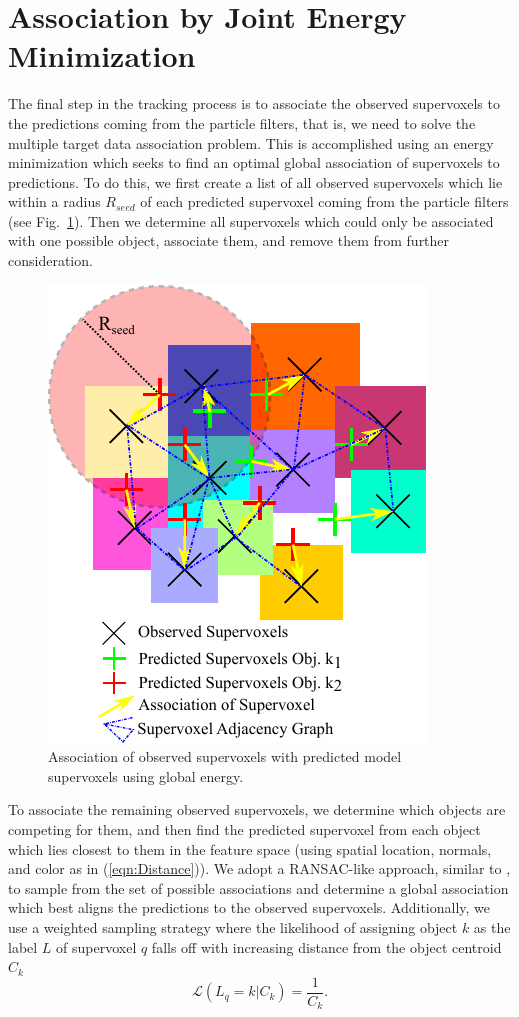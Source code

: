 \section{Association by Joint Energy Minimization}
The final step in the tracking process is to associate the observed supervoxels to the predictions coming from the particle filters, that is, we need to solve the multiple target data association problem. This is accomplished using an energy minimization which seeks to find an optimal global association of supervoxels to predictions. To do this, we first create a list of all observed supervoxels which lie within a radius $R_{seed}$ of each predicted supervoxel coming from the particle filters (see Fig.~\ref{fig:Association}). Then we determine all supervoxels which could only be associated with one possible object, associate them, and remove them from further consideration.

\begin{figure}[tb]
  \centering
  \includegraphics[scale=1.0]{figures/IROS2013/Association.pdf}
  \caption[Supervoxel Association]{Association of observed supervoxels with predicted model supervoxels using global energy.}
  \label{fig:Association}
\end{figure}

To associate the remaining observed supervoxels, we determine which objects are competing for them, and then find the predicted supervoxel from each object which lies closest to them in the feature space (using spatial location, normals, and color as in (\ref{eqn:Distance})). We adopt a RANSAC-like approach, similar to \cite{EnergyBasedMultiModel}, to sample from the set of possible associations and determine a global association which best aligns the predictions to the observed supervoxels. Additionally, we use a weighted sampling strategy where the likelihood of assigning object $k$ as the label $L$ of supervoxel $q$ falls off with increasing distance from the object centroid $C_k$
\begin{equation}
 \label{eqn:WeightSampling}
 \mathcal{L}(L_q=k | C_k) = \frac{1}{C_k}.
\end{equation}

